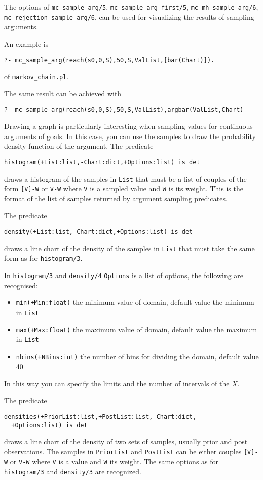 The options of
\verb|mc_sample_arg/5|, \verb|mc_sample_arg_first/5|,   \verb|mc_mh_sample_arg/6|,  \verb|mc_rejection_sample_arg/6|, 
can be used for visualizing the results of sampling arguments.

An example is
\begin{verbatim}
?- mc_sample_arg(reach(s0,0,S),50,S,ValList,[bar(Chart)]).
\end{verbatim}
of \href{http://cplint.eu/example/inference/markov_chain.pl}{\texttt{markov\_chain.pl}}.

The same result can be achieved with
\begin{verbatim}
?- mc_sample_arg(reach(s0,0,S),50,S,ValList),argbar(ValList,Chart)
\end{verbatim}
Drawing a graph is particularly interesting when
sampling values for continuous arguments of goals.
In this case, you can use the samples to draw the
probability density function of the argument.
The predicate
\begin{verbatim}
histogram(+List:list,-Chart:dict,+Options:list) is det
\end{verbatim}
draws a histogram of the samples in \verb|List| that  must be a list of couples of the form \verb|[V]-W| or  \verb|V-W|
where \verb|V| is a sampled value and \verb|W| is its weight. This is the format of the list of samples returned by argument sampling predicates.

The predicate
\begin{verbatim}
density(+List:list,-Chart:dict,+Options:list) is det
\end{verbatim}
draws a line chart of the density of  the samples in \verb|List| that  must take the same form as for \verb|histogram/3|.

In  \verb|histogram/3| and  \verb|density/4| \verb|Options| is a list of options, the following are recognised: \begin{itemize}
\item \verb|min(+Min:float)|
the minimum value of domain, default value the minimum in \verb|List|
\item \verb|max(+Max:float)|
the maximum value of domain, default value the maximum in  \verb|List|
\item \verb|nbins(+NBins:int)|
  the number of bins for dividing the domain, default value 40
\end{itemize}
In this way you can specify the limits and the number of intervals of the $X$.


The predicate
\begin{verbatim}
densities(+PriorList:list,+PostList:list,-Chart:dict,
  +Options:list) is det
\end{verbatim}
draws a line chart of the density of two sets of samples, usually
 prior and post observations. The samples in \verb|PriorList| and \verb|PostList|
can be either couples \verb|[V]-W| or \verb|V-W| where \verb|V| is a value and \verb|W| its weight.
The same options as for \verb|histogram/3| and  \verb|density/3|  are recognized.

